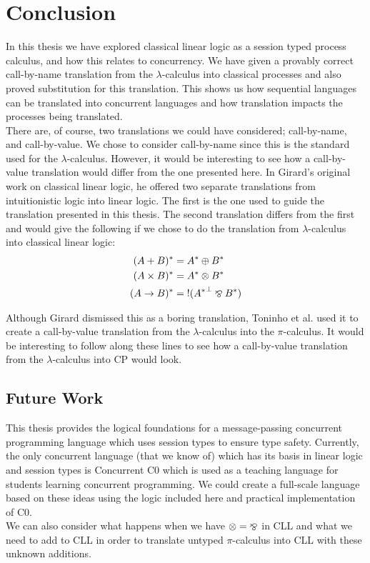 \chapter{Conclusion}
\label{chap:conclusion}

In this thesis we have explored classical linear logic as a session typed process calculus, and 
how this relates to concurrency. We have given a provably correct call-by-name translation from 
the $\lambda$-calculus into classical processes and also proved substitution for this translation. 
This shows us how sequential languages can be translated into concurrent languages and how translation  
impacts the processes being translated. \\

\noindent
There are, of course, two translations we could have considered; call-by-name, and call-by-value. We 
chose to consider call-by-name since this is the standard used for the $\lambda$-calculus. However, 
it would be interesting to see how a call-by-value translation would differ from the one presented here. 
In Girard's original work on classical linear logic, he offered two separate translations from 
intuitionistic logic into linear logic. The first is the one used to guide the translation presented 
in this thesis. The second translation differs from the first and would give the following if we 
chose to do the translation from $\lambda$-calculus into classical linear logic: 
\begin{align*}
    (A + B)^* &= A^* \oplus B^* \\
    (A \times B)^* &= A^* \otimes B^* \\
    (A \rightarrow B)^* &= \ofc(\negg{A^*} \parr B^*)
\end{align*}

\noindent
Although Girard dismissed this as a boring translation, Toninho et al. \cite{toninho2012} used it to 
create a call-by-value translation from the $\lambda$-calculus into the $\pi$-calculus. It would be 
interesting to follow along these lines to see how a call-by-value translation from the $\lambda$-calculus 
into CP would look. \\

\section{Future Work}

This thesis provides the logical foundations for a message-passing concurrent programming language 
which uses session types to ensure type safety. Currently, the only concurrent language (that we know of) 
which has its basis in linear logic and session types is Concurrent C0 \cite{C0Full} which is used 
as a teaching language for students learning concurrent programming. We could create a full-scale language 
based on these ideas using the logic included here and practical implementation of C0. \\

\noindent
We can also consider what happens when we have $\otimes = \mathbin{\bindnasrepma}$ in CLL and what we need to add to CLL 
in order to translate untyped $\pi$-calculus into CLL with these unknown additions. 

